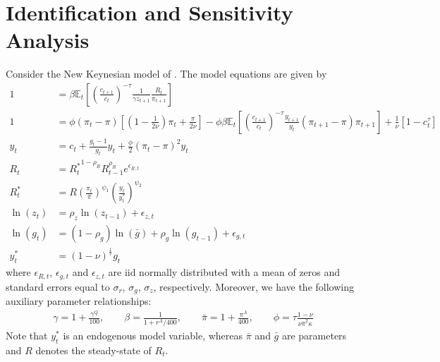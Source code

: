 \section[Identification and Sensitivity Analysis]{Identification and Sensitivity Analysis\label{ex:AnScho2007_identif_bk}}
Consider the New Keynesian model of \textcite{An.Schorfheide_2007_BayesianAnalysisDSGE}.
The model equations are given by 
\begin{align}
1 &= \beta \mathbb{E}_t\left[\left(\frac{c_{t+1}}{c_t}\right)^{-\tau} \frac{1}{\gamma z_{t+1}} \frac{R_t}{\pi_{t+1}}\right] \label{eq:AS_Euler}
\\
1 &= \phi \left(\pi_t - \pi\right) \left[\left(1-\frac{1}{2\nu}\right)\pi_t + \frac{\pi}{2\nu}\right] - \phi \beta \mathbb{E}_t \left[\left(\frac{c_{t+1}}{c_t}\right)^{-\tau} \frac{y_{t+1}}{y_t} \left(\pi_{t+1} - \pi \right) \pi_{t+1}\right] + \frac{1}{\nu}\left[1-c_t^{\tau}\right] \label{eq:AS_PC}
\\
y_t &= c_t + \frac{g_t-1}{g_t} y_t + \frac{\phi}{2} \left({\pi_t - \pi}\right)^2 y_t \label{eq:AS_Market}
\\
R_t &= {R_t^{*}}^{1-\rho_R} R_{t-1}^{\rho_R} e^{\epsilon_{R,t}} \label{eq:AS_Taylor1}
\\
R_t^* &= R \left(\frac{\pi_t}{\bar{\pi}}\right)^{\psi_1} \left(\frac{y_t}{y_t^*}\right)^{\psi_2} \label{eq:AS_Taylor2}
\\
\ln(z_t) &= \rho_z \ln(z_{t-1}) + \epsilon_{z,t} \label{eq:AS_tfpgrowth}
\\
\ln(g_t) &= (1-\rho_g)\ln\left(\bar{g}\right) + \rho_g \ln(g_{t-1}) + \epsilon_{g,t} \label{eq:AS_g}
\\
y_t^* &= (1-\nu)^{\frac{1}{\tau}} g_t \label{eq:AS_flexy}
\end{align}
where $\epsilon_{R,t}$, $\epsilon_{g,t}$ and $\epsilon_{z,t}$ are iid normally distributed with a mean of zeros and standard errors equal to $\sigma_r$, $\sigma_g$, $\sigma_z$, respectively.
Moreover, we have the following auxiliary parameter relationships:
\begin{align*}
\gamma = 1+\frac{\gamma^{Q}}{100}, \qquad
\beta = \frac{1}{1+r^{A}/400}, \qquad
\bar{\pi} = 1+\frac{\pi^{A}}{400}, \qquad
\phi = \tau \frac{1-\nu}{\nu \bar{\pi}^{2}\kappa}
\end{align*}
Note that $y_t^*$ is an endogenous model variable, whereas $\bar{\pi}$ and $\bar{g}$ are parameters and $R$ denotes the steady-state of $R_t$.

